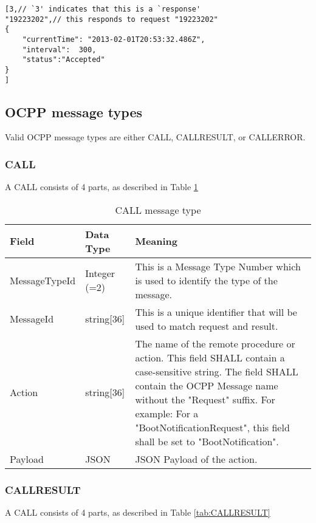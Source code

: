 \documentclass[12pt,openany,a4paper]{book}
\begin{document}
\begin{verbatim}
[3,// `3' indicates that this is a `response'
"19223202",// this responds to request "19223202"
{
    "currentTime": "2013-02-01T20:53:32.486Z",
    "interval":  300,
    "status":"Accepted"
}
]
\end{verbatim}

\pagebreak

\subsection{OCPP message types}

Valid OCPP message types are either CALL, CALLRESULT, or CALLERROR.

\subsubsection{CALL}
A CALL consists of 4 parts, as described in Table \ref{tab:CALL}

\begin{table}[htp]
\begin{tabular}{ |p{3cm}|p{2.5cm}|p{9cm}| }
 \hline
\textbf{Field} & \textbf{Data Type} & \textbf{Meaning}
\\
 \hline MessageTypeId & Integer (=2)& This is a Message Type Number which is used to identify the type of the message.\\
 \hline MessageId & string[36] & This is a unique identifier that will be used to match request and result.\\
 \hline Action & string[36] & The name of the remote procedure or action. This field SHALL contain a case-sensitive string.
The field SHALL contain the OCPP Message name without the "Request" suffix. For example: For
a "BootNotificationRequest", this field shall be set to "BootNotification".\\
 \hline Payload & JSON & JSON Payload of the action.\\
 \hline
\end{tabular}
\caption{CALL message type \cite{ocpp4}}
\label{tab:CALL}
\end{table}


\subsubsection{CALLRESULT}
A CALL consists of 4 parts, as described in Table \ref{tab:CALLRESULT}
\end{document}

